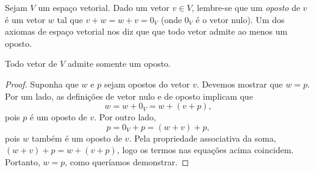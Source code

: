 Sejam $V$ um espaço vetorial. Dado um vetor $v\in V$, lembre-se que um \emph{oposto} de $v$ é um vetor $w$ tal que $v+w=w+v=0_V$ (onde $0_V$ é o vetor nulo). Um dos axiomas de espaço vetorial nos diz que que todo vetor admite ao menos um oposto.

\begin{theorem}
	Todo vetor de $V$ admite somente um oposto.
\end{theorem}
\begin{proof}
	Suponha que $w$ e $p$ sejam opostos do vetor $v$. Devemos mostrar que $w=p$. Por um lado, as definições de vetor nulo e de oposto implicam que
	\[w=w+0_V=w+(v+p),\]
	pois $p$ é um oposto de $v$. Por outro lado,
	\[p=0_V+p=(w+v)+p,\]
	pois $w$ também é um oposto de $v$. Pela propriedade associativa da soma, $(w+v)+p=w+(v+p)$, logo os termos nas equações acima coincidem. Portanto, $w=p$, como queríamos demonstrar.
\end{proof}